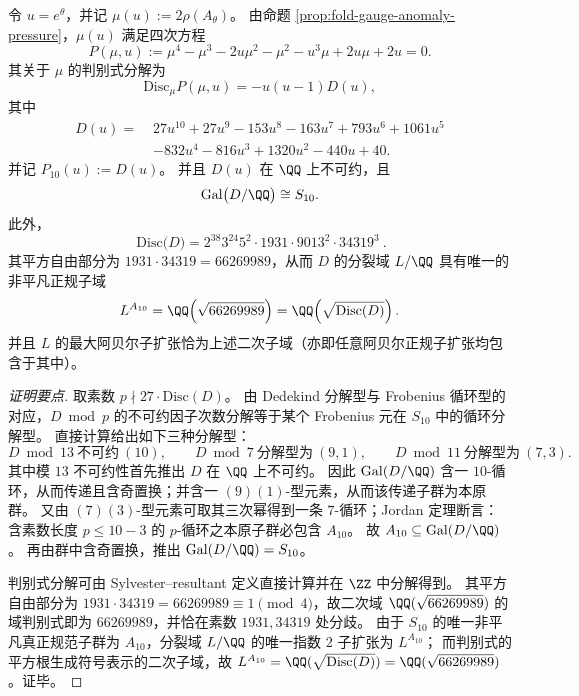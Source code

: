 

\begin{proposition}[判别式十次因子的满对称伽罗瓦性与判别式分解]\label{prop:fold-gauge-anomaly-P10-galois-discriminant}
令 \(u=e^\theta\)，并记 \(\mu(u):=2\rho(A_\theta)\)。
由命题 \ref{prop:fold-gauge-anomaly-pressure}，\(\mu(u)\) 满足四次方程
\[
P(\mu,u):=\mu^4-\mu^3-2u\mu^2-\mu^2-u^3\mu+2u\mu+2u=0.
\]
其关于 \(\mu\) 的判别式分解为
\[
\mathrm{Disc}_{\mu}P(\mu,u)=-u(u-1)D(u),
\]
其中
\[
\begin{aligned}
D(u)=\;&27u^{10}+27u^9-153u^8-163u^7+793u^6+1061u^5\\
&-832u^4-816u^3+1320u^2-440u+40.
\end{aligned}
\]
并记 \(P_{10}(u):=D(u)\)。
并且 \(D(u)\) 在 \(\QQ\) 上不可约，且
\[
\mathrm{Gal}\bigl(D/\QQ\bigr)\cong S_{10}.
\]
此外，
\[
\boxed{\ \mathrm{Disc}\bigl(D\bigr)=2^{38}3^{24}5^{2}\cdot 1931\cdot 9013^{2}\cdot 34319^{3}\ }.
\]
其平方自由部分为 \(1931\cdot 34319=66269989\)，从而 \(D\) 的分裂域 \(L/\QQ\) 具有唯一的非平凡正规子域
\[
L^{A_{10}}=\QQ\!\left(\sqrt{66269989}\right)
=\QQ\!\left(\sqrt{\mathrm{Disc}(D)}\right).
\]
并且 \(L\) 的最大阿贝尔子扩张恰为上述二次子域（亦即任意阿贝尔正规子扩张均包含于其中）。
\end{proposition}
\begin{proof}[证明要点]
取素数 \(p\nmid 27\cdot\mathrm{Disc}(D)\)。
由 Dedekind 分解型与 Frobenius 循环型的对应，\(D\bmod p\) 的不可约因子次数分解等于某个 Frobenius 元在 \(S_{10}\) 中的循环分解型。
直接计算给出如下三种分解型：
\[
D\bmod 13\ \text{不可约}\ (10),\qquad
D\bmod 7\ \text{分解型为}\ (9,1),\qquad
D\bmod 11\ \text{分解型为}\ (7,3).
\]
其中模 \(13\) 不可约性首先推出 \(D\) 在 \(\QQ\) 上不可约。
因此 \(\mathrm{Gal}(D/\QQ)\) 含一 \(10\)-循环，从而传递且含奇置换；并含一 \((9)(1)\)-型元素，从而该传递子群为本原群。
又由 \((7)(3)\)-型元素可取其三次幂得到一条 \(7\)-循环；Jordan 定理断言：含素数长度 \(p\le 10-3\) 的 \(p\)-循环之本原子群必包含 \(A_{10}\)。
故 \(A_{10}\subseteq \mathrm{Gal}(D/\QQ)\)。
再由群中含奇置换，推出 \(\mathrm{Gal}(D/\QQ)=S_{10}\)。
\par
判别式分解可由 Sylvester--resultant 定义直接计算并在 \(\ZZ\) 中分解得到。
其平方自由部分为 \(1931\cdot 34319=66269989\equiv 1\pmod 4\)，故二次域 \(\QQ(\sqrt{66269989})\) 的域判别式即为 \(66269989\)，并恰在素数 \(1931,34319\) 处分歧。
由于 \(S_{10}\) 的唯一非平凡真正规范子群为 \(A_{10}\)，分裂域 \(L/\QQ\) 的唯一指数 \(2\) 子扩张为 \(L^{A_{10}}\)；
而判别式的平方根生成符号表示的二次子域，故 \(L^{A_{10}}=\QQ(\sqrt{\mathrm{Disc}(D)})=\QQ(\sqrt{66269989})\)。证毕。
\end{proof}

